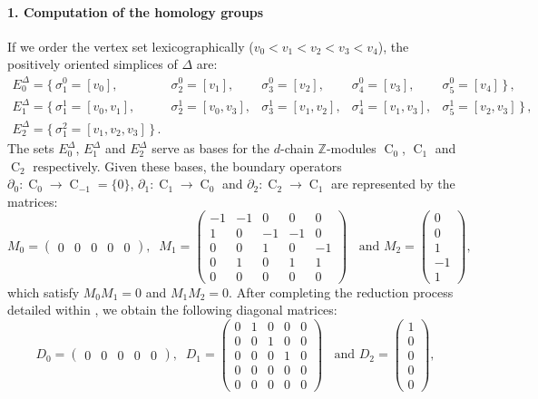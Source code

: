 \documentclass[a4paper,10pt]{article}
\newcommand{\bbz}{\mathbb{Z}}
\DeclareMathOperator{\Co}{C}
\begin{document}
\paragraph{1. Computation of the homology groups}
If we order the vertex set lexicographically (\(v_0 < v_1 < v_2 < v_3 < v_4\)), the positively oriented simplices of \(\Delta\) are:
\[
\begin{array}{lllll}
E^{\Delta}_0 = \big\{\,\sigma^0_1=[v_0], & \sigma^0_2=[v_1], & \sigma^0_3=[v_2], & \sigma^0_4=[v_3], & \sigma^0_5=[v_4]\,\big\}\,, \\[0.6em]
E^{\Delta}_1 = \big\{\,\sigma^1_{1}=[v_0,v_1], & \sigma^1_{2}=[v_0,v_3], & \sigma^1_{3}=[v_1,v_2], & \sigma^1_{4}=[v_1,v_3], & \sigma^1_{5}=[v_2,v_3]\,\big\}\,, \\[0.6em]
E^{\Delta}_2 = \big\{\,\sigma^{2}_{1}=[v_1,v_2,v_3]\,\big\}\,. & & & &
\end{array}
\]
The sets \(E^{\Delta}_{0}\), \(E^{\Delta}_{1}\) and \(E^{\Delta}_{2}\) serve as bases for the \(d\)-chain \(\bbz\)-modules 
\(\Co_0\), \(\Co_1\) and \(\Co_2\) respectively. Given these bases, the boundary operators \(\partial_0: \Co_0 \to \Co_{-1}=\{0\}\), \(\partial_1: \Co_1 \to \Co_0\) and \(\partial_2: \Co_2 \to \Co_1\) are represented by the matrices:
\[
M_0=
\left(\begin{array}{ccccc} 0 & 0 & 0 & 0 & 0 \end{array}\right), \; \;
M_1=
\left(
\begin{array}{rrrrr}
-1 & -1 &  0 &  0 &  0 \\
 1 &  0 & -1 & -1 &  0 \\
 0 &  0 &  1 &  0 & -1 \\
 0 &  1 &  0 &  1 &  1 \\
 0 &  0 &  0 &  0 &  0 
\end{array}
\right)
\; \; \text{ and } M_2=
\left(\begin{array}{r} 0 \\ 0 \\ 1 \\-1 \\ 1 \end{array}\right),
\]
which satisfy \(M_0 M_1=0\) and \(M_1M_2=0\). After completing the reduction process detailed within , we obtain the following diagonal matrices:
\[
D_0=
\left(
\begin{array}{ccccc}
0 & 0 & 0 & 0 & 0 
\end{array}
\right), \; \;
D_1=
\left(
\begin{array}{rrrrr}
 0 &  1 &  0 &  0 &  0 \\
 0 &  0 &  1 &  0 &  0 \\
 0 &  0 &  0 &  1 &  0 \\
 0 &  0 &  0 &  0 &  0 \\
 0 &  0 &  0 &  0 &  0 
\end{array}
\right)
\; \; \text{ and }
D_2=
\left(\begin{array}{r} 1 \\ 0 \\ 0 \\ 0 \\ 0\end{array}\right),
\]
\end{document}

